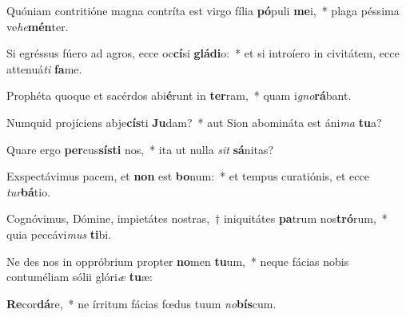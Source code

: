\item Quóniam contritióne magna contríta est virgo fília \textbf{pó}puli \textbf{me}i,~* plaga péssima ve\textit{he}\textbf{mén}ter.
\item Si egréssus fúero ad agros, ecce oc\textbf{cí}si \textbf{glá}\textbf{di}o:~* et si introíero in civitátem, ecce attenuá\textit{ti} \textbf{fa}me.
\item Prophéta quoque et sacérdos abi\textbf{é}runt in \textbf{ter}ram,~* quam i\textit{gno}\textbf{rá}bant.
\item Numquid projíciens abje\textbf{cís}ti \textbf{Ju}dam?~* aut Sion abomináta est áni\textit{ma} \textbf{tu}a?
\item Quare ergo \textbf{per}cus\textbf{sís}\textbf{ti} nos,~* ita ut nulla \textit{sit} \textbf{sá}nitas?
\item Exspectávimus pacem, et \textbf{non} est \textbf{bo}num:~* et tempus curatiónis, et ecce \textit{tur}\textbf{bá}tio.
\item Cognóvimus, Dómine, impietátes nostras,~† iniquitátes \textbf{pa}trum nos\textbf{tró}rum,~* quia peccávi\textit{mus} \textbf{ti}bi.
\item Ne des nos in oppróbrium propter \textbf{no}men \textbf{tu}um,~* neque fácias nobis contuméliam sólii glóri\textit{æ} \textbf{tu}æ:
\item \textbf{Re}cor\textbf{dá}re,~* ne írritum fácias fœdus tuum \textit{no}\textbf{bís}cum.
